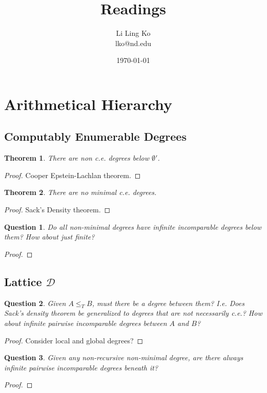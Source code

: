 \documentclass{article}
\newtheorem{theorem}{Theorem}[subsection]
\newtheorem{question}{Question}[subsection]
\begin{document}
\title{Readings}
\author{Li Ling Ko\\ lko@nd.edu}
\date{\today}
\maketitle

\section{Arithmetical Hierarchy}
  \subsection{Computably Enumerable Degrees}
    \begin{theorem}
      There are non c.e. degrees below $\emptyset'$.
    \end{theorem}
    \begin{proof}
      Cooper Epstein-Lachlan theorem.
    \end{proof}

    \begin{theorem}
      There are no minimal c.e. degrees.
    \end{theorem}
    \begin{proof}
      Sack's Density theorem.
    \end{proof}

    \begin{question}
      Do all non-minimal degrees have infinite incomparable degrees below
      them? How about just finite?
    \end{question}
    \begin{proof}
    \end{proof}

  \subsection{Lattice $\mathcal{D}$}
    \begin{question}
      Given $A\leq_T B$, must there be a degree between them? I.e. Does
      Sack's density theorem be generalized to degrees that are not
      necessarily c.e.? How about infinite pairwise incomparable degrees
      between $A$ and $B$?
    \end{question}
    \begin{proof}
      Consider local and global degrees?
    \end{proof}

    \begin{question}
      Given any non-recursive non-minimal degree, are there always infinite
      pairwise incomparable degrees beneath it?
    \end{question}
    \begin{proof}
    \end{proof}
\end{document}
